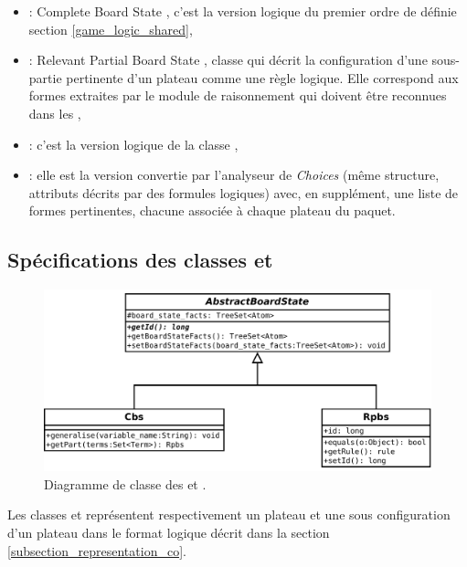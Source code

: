 \begin{itemize}
  \item \textbf{} : \og Complete Board State \fg{}, c'est la version logique du premier ordre de  définie section \vref{game_logic_shared},
  
  \item \textbf{} : \og Relevant Partial Board State \fg{}, classe qui décrit la configuration d'une sous-partie pertinente d'un plateau comme une règle logique. Elle correspond aux \og formes \fg{} extraites par le module de raisonnement qui doivent être reconnues dans les ,
  
   \item \textbf{} : c'est la version logique de la classe ,
   
   \item \textbf{} : elle est la version convertie par l'analyseur de \emph{Choices} (même structure, attributs décrits par des formules logiques) avec, en supplément, une liste de formes pertinentes, chacune associée à chaque plateau du paquet.
\end{itemize}


\subsection{Spécifications des classes  et }
\label{subsection_cbs_rpbs}

\begin{figure}[H] 
\centering
    \includegraphics[width=\textwidth]{files/class_diagram/rpbs_cbs} 
\caption{Diagramme de classe des  et .} 
\label{img_diag_class_board_state}
\end{figure}

Les classes  et  représentent respectivement un plateau et une sous configuration d'un plateau dans le format logique décrit dans la section \vref{subsection_representation_co}. 

